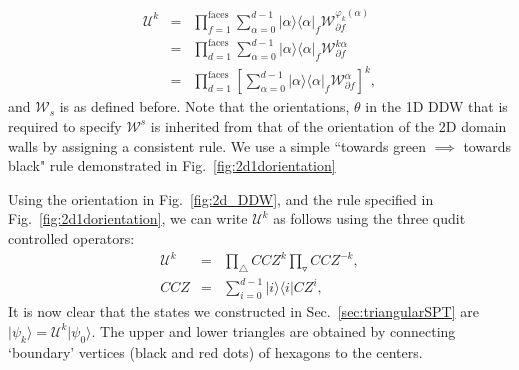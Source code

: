 \documentclass[aps,amsfonts,pra,twocolumn,showpacs]{revtex4-1}
\def\ket#1{\vert#1\rangle}
\newcommand{\outerproduct}[2]{|#1\rangle\langle #2|}
\begin{document}
	\begin{eqnarray}
	\mathcal{U}^k &=& \prod_{f = 1}^{\text{faces}} \sum_{\alpha=0}^{d-1} \outerproduct{\alpha}{\alpha}_f \mathcal{W}_{\partial f}^{\varphi_k(\alpha)} \nonumber \\
	&=& \prod_{d = 1}^{\text{faces}} \sum_{\alpha=0}^{d-1} \outerproduct{\alpha}{\alpha}_f \mathcal{W}_{\partial f}^{k\alpha} \nonumber \\
	&=& \prod_{d = 1}^{\text{faces}} \left[ \sum_{\alpha=0}^{d-1} \outerproduct{\alpha}{\alpha}_f \mathcal{W}_{\partial f}^{\alpha} \right]^k, 
	\end{eqnarray}
and $\mathcal{W}_s$ is as defined before. Note that the orientations, $\theta$ in the 1D DDW that is required to specify $\mathcal{W}^s$ is inherited from that of the orientation of the 2D domain walls by assigning a consistent rule. We use a simple ``towards green $\implies$ towards black" rule demonstrated in Fig.~\ref{fig:2d1dorientation}

Using the orientation in Fig.~\ref{fig:2d_DDW}, and the rule specified in Fig.~\ref{fig:2d1dorientation}, we can write $\mathcal{U}^k$ as follows using the three qudit controlled operators:
	\begin{eqnarray}
	\mathcal{U}^k &=& \prod_{\triangle} CCZ^{k} \prod_{\triangledown} CCZ^{-k}, \\
	CCZ &=& \sum_{i=0}^{d-1} \outerproduct{i}{i} CZ^i,
	\end{eqnarray}
It is now clear that the states we constructed in Sec.~\ref{sec:triangularSPT} are  $\ket{\psi_k} = \mathcal{U}^k \ket{\psi_0}$. The upper and lower triangles are obtained  by connecting `boundary' vertices (black and red dots) of hexagons to the centers. 
\end{document}

